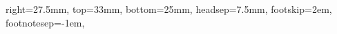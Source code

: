 {{                  %
   right=27.5mm,       %
   top=33mm,         %
	bottom=25mm,      %
   headsep=7.5mm,     %
   footskip=2em,    %
   footnotesep=-1em, %
}
} %

